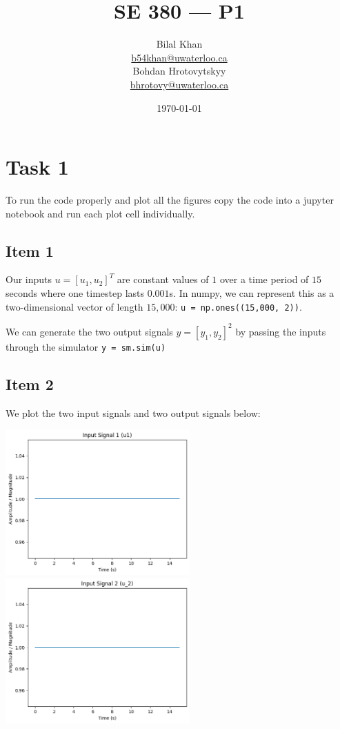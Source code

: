 \documentclass[11pt]{article}
\title{SE 380 — P1}
\author{Bilal Khan\\
\href{mailto:b54khan@uwaterloo.ca}{b54khan@uwaterloo.ca}\\
Bohdan Hrotovytskyy\\
\href{mailto:bhrotovy@uwaterloo.ca}{bhrotovy@uwaterloo.ca}}
\date{\today}
\begin{document}
\maketitle

\tableofcontents

\section{Task 1}

To run the code properly and plot all the figures copy the code into a jupyter notebook and run each plot cell individually.

\subsection{Item 1}

Our inputs $u = [u_1, u_2]^T$ are constant values of $1$ over a time period of $15$ seconds where one timestep lasts $0.001$s. In numpy, we can represent this as a two-dimensional vector of length $15,000$: \texttt{u = np.ones((15,000, 2))}.

We can generate the two output signals $y = [y_1, y_2]^2$ by passing the inputs through the simulator \texttt{y = sm.sim(u)}

\subsection{Item 2}

We plot the two input signals and two output signals below:

\includegraphics[width=200pt]{p1_1.png}
\includegraphics[width=200pt]{p1_2.png}
\end{document}
